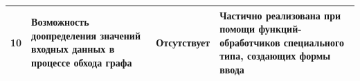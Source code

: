 \begin{landscape}
\begin{longtable}{|p{}|p{}|p{}|p{}|}
    \hline
    10         & Возможность доопределения значений входных данных в процессе обхода графа                                                            & Отсутствует                                                                                                                                                                                                                                                                                                                                                                                                                                                                                                                                                                           & Частично реализована при помощи функций-обработчиков специального типа, создающих формы ввода                                                                                                                                                                                                                   \\
    \hline
  \end{longtable}
\end{landscape}